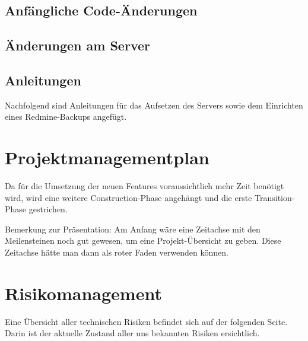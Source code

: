 \documentclass[12pt, a4paper]{report}
\begin{document}
	\section{Anfängliche Code-Änderungen}
	\label{sec:AnfaenglicheCodeAenderungen}
	
	
	\section{Änderungen am Server}
	\label{sec:AenderungenAmServer}
	
	
	\section{Anleitungen}
	\label{sec:Anleitungen}
	Nachfolgend sind Anleitungen für das Aufsetzen des Servers sowie dem Einrichten eines Redmine-Backups angefügt.
	
	
	
	
	
	\chapter{Projektmanagementplan}
	
	Da für die Umsetzung der neuen Features voraussichtlich mehr Zeit benötigt wird, wird eine weitere Construction-Phase angehängt und die erste Transition-Phase gestrichen.
	
	Bemerkung zur Präsentation:
	Am Anfang wäre eine Zeitachse mit den Meilensteinen noch gut gewesen, um eine Projekt-Übersicht zu geben. Diese Zeitachse hätte man dann als roter Faden verwenden können.
	
	
	
	\chapter{Risikomanagement}
	Eine Übersicht aller technischen Risiken befindet sich auf der folgenden Seite. Darin ist der aktuelle Zustand aller uns bekannten Risiken ersichtlich.
	
\end{document}
